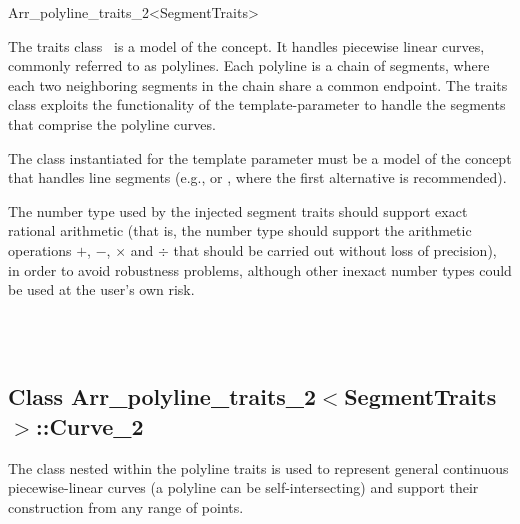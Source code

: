 
\ccRefPageBegin
\begin{ccRefClass}{Arr_polyline_traits_2<SegmentTraits>}

\ccDefinition

The traits class \ccRefName\ is a model of the 
concept. It handles piecewise linear curves, commonly referred to as
polylines. Each polyline is a chain of segments, where each two neighboring
segments in the chain share a common endpoint. The traits class exploits the
functionality of the  template-parameter to handle the
segments that comprise the polyline curves.

The class instantiated for the template parameter  must
be a model of the  concept that handles line
segments (e.g.,  or 
, where the first
alternative is recommended).

The number type used by the injected segment traits should support exact
rational arithmetic (that is, the number type should support
the arithmetic operations $+$, $-$, $\times$ and $\div$ that should be
carried out without loss of precision), in order to avoid robustness
problems, although other inexact number types could be used at the user's
own risk.


\ccIsModel
  \\
  \\

\subsection*{Class Arr\_polyline\_traits\_2$<$SegmentTraits$>$::Curve\_2}

The  class nested within the polyline traits is used to
represent general continuous piecewise-linear curves (a polyline can be
self-intersecting) and support their construction from any range of points.


\end{ccRefClass}
